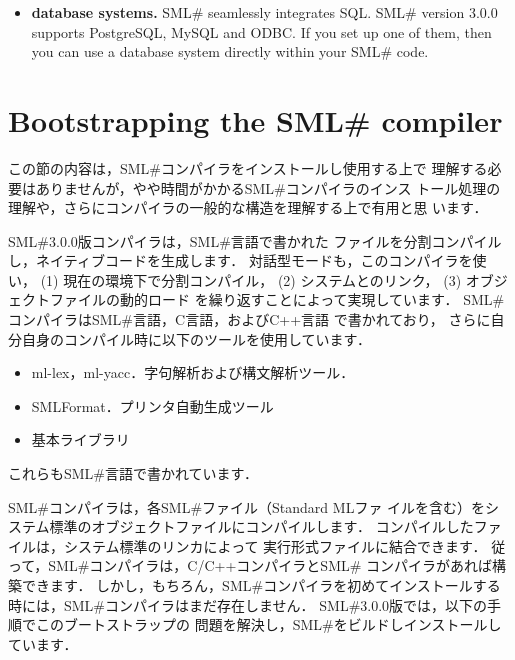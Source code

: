 \documentclass{jbook}
\newif\ifjp
\newcommand{\txt}[2]{#2}
\newcommand{\smlsharp}{SML\#}
\newcommand{\version}{3.0.0}
\begin{document}
\begin{itemize}
	If your purpose is to make a small program entirely within
\smlsharp{}, then you will not need to invoke a C compiler directly.
	However, if you want to make a paractical program, you may want to
call some system library functions or you may write some part of your
system in C and call that function from your ML code.
	This is straightforward in \smlsharp{}.
	To exploit this feature, we recommend that you familiarize
yourself with C compiler.

\item {\bf database systems.}
	\smlsharp{} seamlessly integrates SQL.
	\smlsharp{} version \version{} supports PostgreSQL, MySQL and ODBC.
	If you set up one of them, then you can use a database system
directly within your \smlsharp{} code.
\end{itemize}

\fi%


\section{
\txt{\smlsharp{}コンパイラの構造とブートストラップ}
    {Bootstrapping the \smlsharp{} compiler}
}
\label{sec:tutorialBootstrap}

\ifjp%
	この節の内容は，\smlsharp{}コンパイラをインストールし使用する上で
理解する必要はありませんが，やや時間がかかる\smlsharp{}コンパイラのインス
トール処理の理解や，さらにコンパイラの一般的な構造を理解する上で有用と思
います．

	\smlsharp{}\version{}版コンパイラは，\smlsharp{}言語で書かれた
ファイルを分割コンパイルし，ネイティブコードを生成します．
	対話型モードも，このコンパイラを使い，
(1) 現在の環境下で分割コンパイル，
(2) システムとのリンク，
(3) オブジェクトファイルの動的ロード
を繰り返すことによって実現しています．
	\smlsharp{}コンパイラは\smlsharp{}言語，C言語，およびC++言語
で書かれており，
さらに自分自身のコンパイル時に以下のツールを使用しています．
\begin{itemize}
\item ml-lex，ml-yacc．字句解析および構文解析ツール．
\item SMLFormat．プリンタ自動生成ツール
\item 基本ライブラリ
\end{itemize}
	これらも\smlsharp{}言語で書かれています．

	\smlsharp{}コンパイラは，各\smlsharp{}ファイル（Standard MLファ
イルを含む）をシステム標準のオブジェクトファイルにコンパイルします．
	コンパイルしたファイルは，システム標準のリンカによって
実行形式ファイルに結合できます．
	従って，\smlsharp{}コンパイラは，C/C++コンパイラと\smlsharp{}
コンパイラがあれば構築できます．
	しかし，もちろん，\smlsharp{}コンパイラを初めてインストールする
時には，\smlsharp{}コンパイラはまだ存在しません．
	\smlsharp{}\version{}版では，以下の手順でこのブートストラップの
問題を解決し，\smlsharp{}をビルドしインストールしています．
\end{document}
